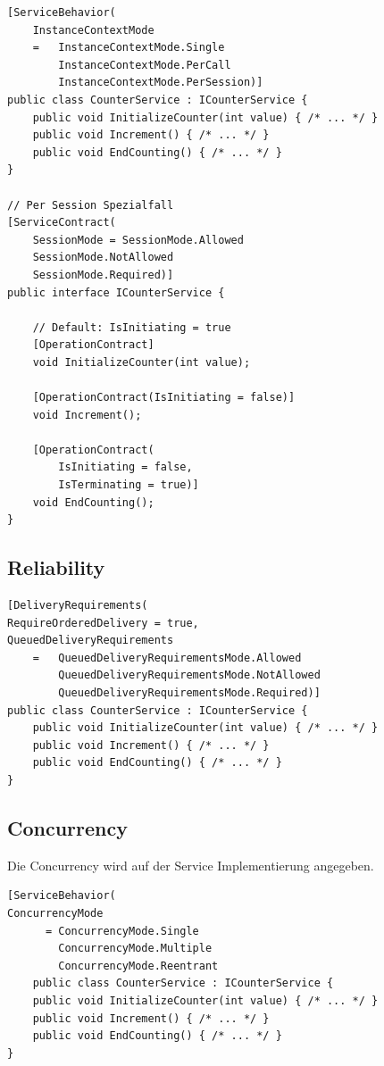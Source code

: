 \documentclass[
a4paper,
oneside,
10pt,
fleqn,
headsepline,
toc=listofnumbered, 
bibliography=totocnumbered]{scrartcl}
\begin{document}
\begin{lstlisting}[caption=Instanzmodelle]
[ServiceBehavior(
	InstanceContextMode
	= 	InstanceContextMode.Single
		InstanceContextMode.PerCall
		InstanceContextMode.PerSession)]
public class CounterService : ICounterService {
	public void InitializeCounter(int value) { /* ... */ }
	public void Increment() { /* ... */ }
	public void EndCounting() { /* ... */ }
}

// Per Session Spezialfall
[ServiceContract(
	SessionMode = SessionMode.Allowed
	SessionMode.NotAllowed
	SessionMode.Required)]
public interface ICounterService {

	// Default: IsInitiating = true
	[OperationContract] 
	void InitializeCounter(int value);

	[OperationContract(IsInitiating = false)]
	void Increment();

	[OperationContract(
		IsInitiating = false,
		IsTerminating = true)]
	void EndCounting();
}
\end{lstlisting}

\clearpage

\subsection{Reliability}
\begin{lstlisting}[caption=WCF Reliability]
[DeliveryRequirements(
RequireOrderedDelivery = true,
QueuedDeliveryRequirements
	= 	QueuedDeliveryRequirementsMode.Allowed
		QueuedDeliveryRequirementsMode.NotAllowed
		QueuedDeliveryRequirementsMode.Required)]
public class CounterService : ICounterService {
	public void InitializeCounter(int value) { /* ... */ }
	public void Increment() { /* ... */ }
	public void EndCounting() { /* ... */ }
}
\end{lstlisting}

\subsection{Concurrency}
Die Concurrency wird auf der Service Implementierung angegeben.
\begin{lstlisting}[caption=WCF Concurrency]
[ServiceBehavior(
ConcurrencyMode
	  = ConcurrencyMode.Single
		ConcurrencyMode.Multiple
		ConcurrencyMode.Reentrant
	public class CounterService : ICounterService {
	public void InitializeCounter(int value) { /* ... */ }
	public void Increment() { /* ... */ }
	public void EndCounting() { /* ... */ }
}
\end{lstlisting}
\end{document}
